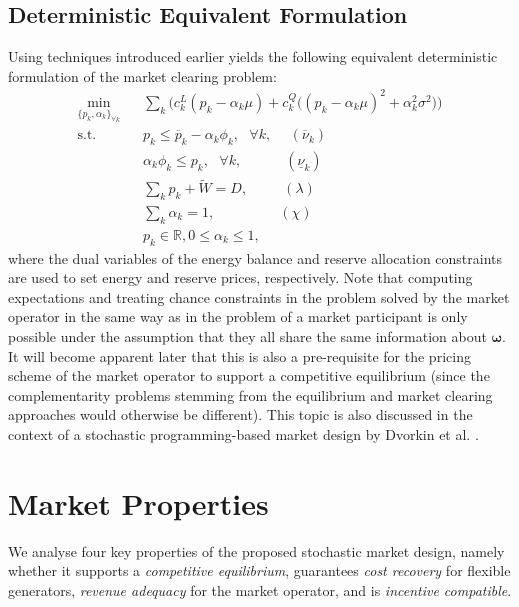 \documentclass{article}
\begin{document}
\subsection{Deterministic Equivalent Formulation}
Using techniques introduced earlier yields the following equivalent deterministic formulation of the market clearing problem:
\begin{align}
\underset{\{p_k, \alpha_k\}_{\forall k}}{\min} \hspace{10pt} & \sum_k \Big(c_k^L(p_k - \alpha_k \mu) + c_k^Q \big((p_k - \alpha_k \mu)^2 + \alpha_k^2 \sigma^2\big)\Big)\\
\mbox{s.t. } & p_k \le \overline{p}_k - \alpha_k \phi_k, \mbox{ }\forall k, \hspace{15pt}(\overline{\nu}_k)\\
& \alpha_k \phi_k \le p_k, \mbox{ }\forall k, \hspace{37pt}(\underline{\nu}_k)\\
& \sum_k p_k + \tilde{W} = D, \hspace{30pt} (\lambda)\\
& \sum_k \alpha_k = 1,\hspace{55pt} (\chi) \\
& p_k \in \mathbb{R}, 0 \le \alpha_k \le 1,
\end{align}
where the dual variables of the energy balance and reserve allocation constraints are used to set energy and reserve prices, respectively. Note that computing expectations and treating chance constraints in the problem solved by the market operator in the same way as in the problem of a market participant is only possible under the assumption that they all share the same information about $\boldsymbol{\omega}$. It will become apparent later that this is also a pre-requisite for the pricing scheme of the market operator to support a competitive equilibrium (since the complementarity problems stemming from the equilibrium and market clearing approaches would otherwise be different). This topic is also discussed in the context of a stochastic programming-based market design by Dvorkin et al. \cite{DvorkinV2019}.

\section{Market Properties}

We analyse four key properties of the proposed stochastic market design, namely whether it supports a \textit{competitive equilibrium}, guarantees \textit{cost recovery} for flexible generators, \textit{revenue adequacy} for the market operator, and is \textit{incentive compatible}.
\end{document}
